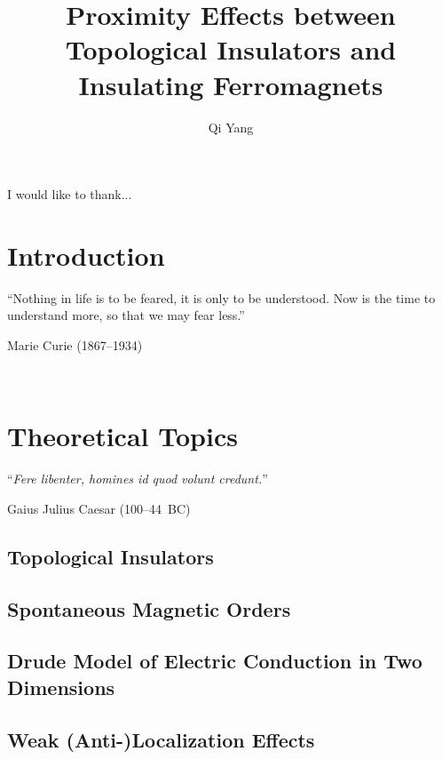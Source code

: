 ﻿\documentclass{report}
\begin{document}
\title{Proximity Effects between Topological Insulators and Insulating Ferromagnets}
\author{Qi Yang}

\keepXColumns

\beforepreface
%

    

    I would like to thank...
\afterpreface
\captionsetup{width=0.95\columnwidth}%

\chapter{Introduction}\label{ch:intro}
\epigraph{``Nothing in life is to be feared, it is only to be understood. Now is the time to understand more, so that we may fear less.''}{Marie Curie (1867--1934)}~\\
    

\chapter{Theoretical Topics}\label{ch:theory}
\epigraph{``\textit{Fere libenter, homines id quod volunt credunt.}''}{Gaius Julius Caesar (100--44~BC)}
    \section{Topological Insulators}\label{sec:ti}
        
    \section{Spontaneous Magnetic Orders}\label{sec:magnetism}
        
    \section{Drude Model of Electric Conduction in Two Dimensions}\label{sec:drude}
        
    \section{Weak (Anti-)Localization Effects}\label{sec:wl}
        
\end{document}
